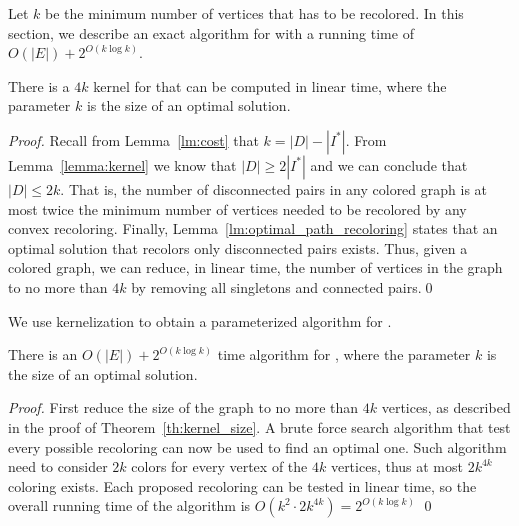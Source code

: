 \label{sec:fpt}

Let $k$ be the minimum number of vertices that has to be recolored. In this
section, we describe an exact algorithm for \TWOCR{} with a running time
of $O(|E|) + 2^{O(k \log k)}$.

\begin{theorem}
\label{th:kernel_size}
There is a $4k$ kernel for \TWOCR{} that can be computed in linear time, where the
parameter $k$ is the size of an optimal solution.
\end{theorem}

\begin{proof}
Recall from Lemma~\ref{lm:cost} that $k = |D| - |I^*|$.
From Lemma~\ref{lemma:kernel} we know that $|D| \geq 2|I^*|$ and we can
conclude that $|D| \leq 2k$.
That is, the number of disconnected pairs in any colored graph is at most twice
the minimum number of vertices needed to be recolored by any convex recoloring.
Finally, Lemma~\ref{lm:optimal_path_recoloring} states that an optimal solution
that recolors only disconnected pairs exists.
Thus, given a colored graph, we can reduce, in linear time, the number of
vertices in the graph to no more than $4k$ by removing all singletons and connected
pairs.\qed{}
\end{proof}

We use kernelization to obtain a parameterized algorithm for \TWOCR{}.

\begin{theorem}
There is an $O(|E|) + 2^{O(k\log{k})}$ time algorithm for \TWOCR{}, where
the parameter $k$ is the size of an optimal solution.
\end{theorem}

\begin{proof}
	First reduce the size of the graph to no more than $4k$ vertices, as described
	in the proof of Theorem~\ref{th:kernel_size}.
	A brute force search algorithm
	that test every possible recoloring can now be used to find an optimal one.
	Such algorithm need to consider $2k$ colors for every vertex of the $4k$
	vertices, thus at most $2k^{4k}$ coloring exists. 
	Each proposed recoloring can be tested in linear time, so the overall running
	time of the algorithm is $O(k^2 \cdot 2k^{4k}) =  2^{O(k\log{k})}$
\qed{}\end{proof}

